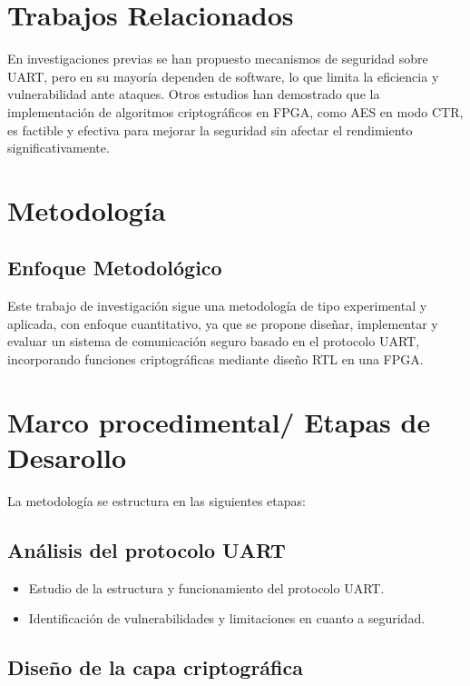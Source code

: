 \section{Trabajos Relacionados}
En investigaciones previas se han propuesto mecanismos de seguridad sobre UART, pero en su mayoría dependen de software, lo que limita la eficiencia y vulnerabilidad ante ataques. Otros estudios han demostrado que la implementación de algoritmos criptográficos en FPGA, como AES en modo CTR, es factible y efectiva para mejorar la seguridad sin afectar el rendimiento significativamente.



\section{Metodología}
\subsection{Enfoque Metodol\'ogico}

Este trabajo de investigación sigue una metodología de tipo experimental y aplicada, con enfoque cuantitativo, ya que se propone diseñar, implementar y evaluar un sistema de comunicación seguro basado en el protocolo UART, incorporando funciones criptográficas mediante diseño RTL en una FPGA.




\section{Marco procedimental/ Etapas de Desarollo}
La metodología se estructura en las siguientes etapas:



\subsection{Análisis del protocolo UART }

\begin{itemize}
\item Estudio de la estructura y funcionamiento del protocolo UART.
\item Identificación de vulnerabilidades y limitaciones en cuanto a seguridad.
\end{itemize}

\subsection{Diseño de la capa criptogr\'afica }

